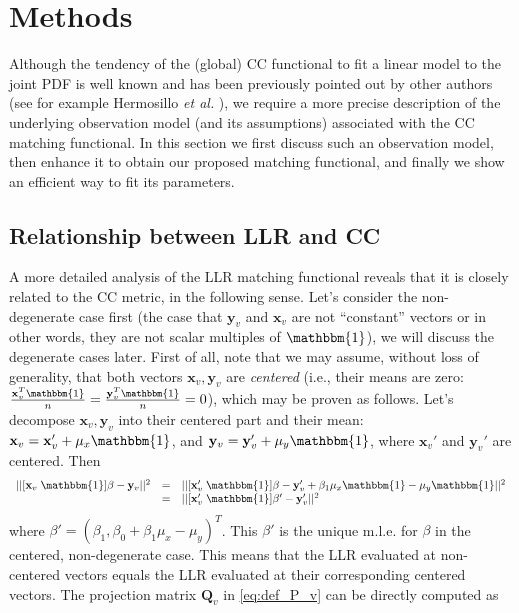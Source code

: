 \section{Methods}
Although the tendency of the (global) CC functional to fit a linear model to the joint PDF is well known and has been previously pointed out by other authors (see for example Hermosillo {\it et al.} \cite{Hermosillo2004}), we require a more precise description of the underlying observation model (and its assumptions) associated with the CC matching functional. In this section we first discuss such an observation model, then enhance it to obtain our proposed matching functional, and finally we show an efficient way to fit its parameters.

\subsection{Relationship between LLR and CC}
A more detailed analysis of the LLR matching functional reveals that it is closely related to the CC metric, in the following sense. Let's consider the non-degenerate case first (the case that $\mathbf{y}_{v}$ and $\mathbf{x}_{v}$ are not ``constant'' vectors or in other words, they are not scalar multiples of $\mathbbm{1}$), we will discuss the degenerate cases later. First of all, note that we may assume, without loss of generality, that both vectors $\mathbf{x}_{v}, \mathbf{y}_{v}$ are \emph{centered} (i.e., their means are zero: $\frac{\mathbf{x}_{v}^{T}\mathbbm{1}}{n} = \frac{\mathbf{y}_{v}^{T}\mathbbm{1}}{n} = 0$), which may be proven as follows. Let's decompose $\mathbf{x}_{v}, \mathbf{y}_{v}$ into their centered part and their mean: $\mathbf{x}_{v} = \mathbf{x}_{v}' + \mu_{x}\mathbbm{1}$, and $\mathbf{y}_{v} = \mathbf{y}_{v}' + \mu_{y}\mathbbm{1}$, where $\mathbf{x}_{v}'$ and $\mathbf{y}_{v}'$ are centered. Then
\begin{displaymath}
    \begin{array}{lcl}
        ||[\mathbf{x}_{v} \; \mathbbm{1}]\beta - \mathbf{y}_{v}||^{2} &=& ||[\mathbf{x}_{v}' \; \mathbbm{1}]\beta - \mathbf{y}_{v}' + \beta_{1}\mu_{x}\mathbbm{1} - \mu_{y}\mathbbm{1}||^{2}\\
        &=&||[\mathbf{x}_{v}' \; \mathbbm{1}]\beta' - \mathbf{y}_{v}'||^{2}
    \end{array}
\end{displaymath}
where $\beta' = (\beta_{1}, \beta_{0} + \beta_{1}\mu_{x} - \mu_{y})^{T}$. This $\beta'$ is the unique m.l.e. for $\beta$ in the centered, non-degenerate case. This means that the LLR evaluated at non-centered vectors equals the LLR evaluated at their corresponding centered vectors. The projection matrix $\mathbf{Q}_{v}$ in \eqref{eq:def_P_v} can be directly computed as
